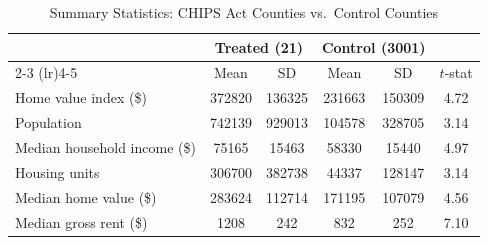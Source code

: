 \begin{table}[htbp]
\centering
\caption{Summary Statistics: CHIPS Act Counties vs.\ Control Counties}
\label{tab:summary}
\begin{tabular}{l cc cc c}
\toprule
 & \multicolumn{2}{c}{Treated (21)} & \multicolumn{2}{c}{Control (3001)} & \\
\cmidrule(lr){2-3} \cmidrule(lr){4-5}
 & Mean & SD & Mean & SD & $t$-stat \\
\midrule
Home value index (\$) & 372820 & 136325 & 231663 & 150309 & 4.72 \\
Population & 742139 & 929013 & 104578 & 328705 & 3.14 \\
Median household income (\$) & 75165 & 15463 & 58330 & 15440 & 4.97 \\
Housing units & 306700 & 382738 & 44337 & 128147 & 3.14 \\
Median home value (\$) & 283624 & 112714 & 171195 & 107079 & 4.56 \\
Median gross rent (\$) & 1208 & 242 & 832 & 252 & 7.10 \\
\bottomrule
\end{tabular}
\par{}
\end{table}

